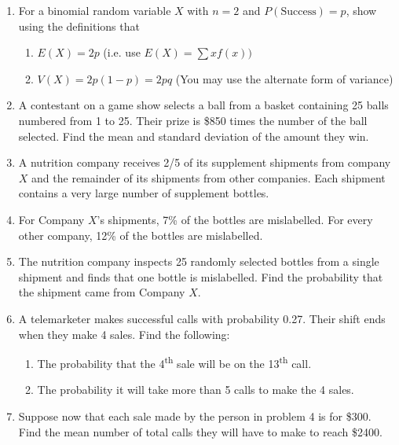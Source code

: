 \documentclass{article}
\begin{document}
\begin{enumerate}
    \item For a binomial random variable $X$ with $n = 2$ and $P(\text{Success}) = p$, show using the definitions that%
    \begin{enumerate}
        \item $E(X) = 2p$ \hspace{85pt} (i.e. use $E(X) = \sum x f(x))$
        \item $V(X) = 2p(1 - p) = 2pq $\hspace{30pt} (You may use the alternate form of variance)
    \end{enumerate}\bigskip
    
    \item A contestant on a game show selects a ball from a basket containing 25 balls numbered from 1 to 25. Their prize is \$850 times the number of the ball selected. Find the mean and standard deviation of the amount they win.\bigskip%
    
    \item A nutrition company receives 2/5 of its supplement shipments from company $X$ and the remainder of its shipments from other companies. Each shipment contains a very large number of supplement bottles.%
    \item[] For Company $X$'s shipments, 7\% of the bottles are mislabelled. For every other company, 12\% of the bottles are mislabelled.
    \item[] The nutrition company inspects 25 randomly selected bottles from a single shipment and finds that one bottle is mislabelled. Find the probability that the shipment came from Company $X$.
    
    \item A telemarketer makes successful calls with probability 0.27. Their shift ends when they make 4 sales. Find the following:%
    \begin{enumerate}
        \item The probability that the 4\textsuperscript{th} sale will be on the 13\textsuperscript{th} call.
        \item The probability it will take more than 5 calls to make the 4 sales.
    \end{enumerate}\bigskip
    
    \item Suppose now that each sale made by the person in problem 4 is for \$300. Find the mean number of total calls they will have to make to reach \$2400.\bigskip%
    

\end{enumerate}
\end{document}
